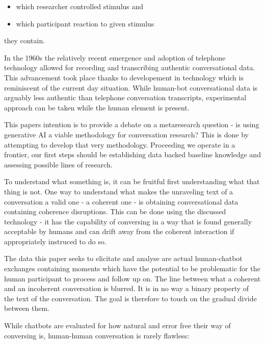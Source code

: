 \documentclass[12pt]{report}
\begin{document}
\begin{itemize}

    \item
    which researcher controlled stimulus and

    \item
    which participant reaction to given stimulus
\end{itemize}

they contain.

\par
In the 1960s the relatively recent emergence and adoption of telephone technology
allowed for recording and transcribing authentic conversational data.
This advancement took place thanks to developement in technology
which is reminiscent of the current day situation.
While human-bot conversational data is arguably less authentic than telephone conversation transcripts,
experimental approach can be taken while the human element is present.

\par
This papers intention is to provide a debate on a metaresearch question -
is using generative AI a viable methodology for conversation research?
This is done by attempting to develop that very methodology.
Proceeding we operate in a frontier,
our first steps should be establishing data backed baseline knowledge
and assessing possible lines of research.

\par
To understand what something is,
it can be fruitful first understanding what that thing is not.
One way to understand what makes the unraveling text of a conversation
a valid one - a coherent one -
is obtaining conversational data containing coherence disruptions.
This can be done using the discussed technology -
it has the capability of conversing in a way
that is found generally acceptable by humans
and can drift away from the coherent interaction
if appropriately instruced to do so.

\par
The data this paper seeks to elicitate and analyse are
actual human-chatbot exchanges containing moments which
have the potential to be problematic for
the human participant to process and follow up on.
The line between what a coherent and an incoherent conversation is blurred.
It is in no way a binary property of the text of the conversation.
The goal is therefore to touch on the gradual divide between them.

\par
While chatbots are evaluated for how natural and error free their way of conversing is,
human-human conversation is rarely flawless:
\end{document}
